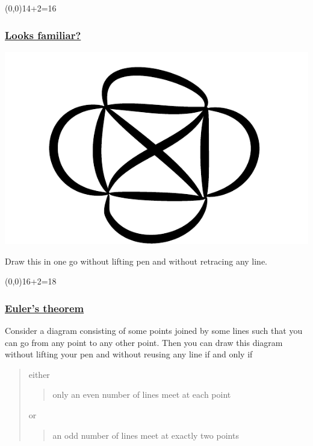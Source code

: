 \begin{frame}\begin{textblock}{1}(0,0)14+2=16\end{textblock}\frametitle{{\color{red}\underline{\Large\bf
}}}\frametitle{\underline{\Large\bf
Looks familiar?}}

\begin{center}
\includegraphics[scale=0.5]{image/euler1.pdf}\\
{\em \underline{}}
\end{center}


\pause

Draw this in one go without lifting pen and without retracing any line.
\end{frame}
\begin{frame}\begin{textblock}{1}(0,0)16+2=18\end{textblock}\frametitle{{\color{red}\underline{\Large\bf
}}}\frametitle{\underline{\Large\bf
Euler's theorem}}
Consider a diagram consisting of some points
joined by some lines such that you can go from any point to any
other point. Then you can draw this diagram without lifting your
pen and without  reusing any line if and only if 

\begin{quote}
either 
  
\begin{quote}
only an even number of lines meet at each point
\end{quote}

or

\begin{quote}
an odd number of lines meet at exactly two points
\end{quote}
  

\end{quote}

\end{frame}
